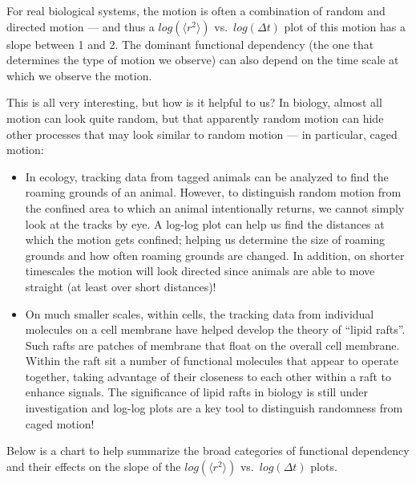  \par
For real biological systems, the motion is often a combination of random and directed motion — and thus a $log(\langle r^{2} \rangle)$ vs.\ $log(\Delta t)$ plot of this motion has a slope between 1 and 2. 
The dominant functional dependency (the one that determines the type of motion we observe) can also depend on the time scale at which we observe the motion.
\par
This is all very interesting, but how is it helpful to us?
In biology, almost all motion can look quite random, but that apparently random motion can hide other processes that may look similar to random motion — in particular, caged motion:
\begin{itemize}
\item In ecology, tracking data from tagged animals can be analyzed to find the roaming grounds of an animal.
However, to distinguish random motion from the confined area to which an animal intentionally returns, we cannot simply look at the tracks by eye.
A log-log plot can help us find the distances at which the motion gets confined; helping us determine the size of roaming grounds and how often roaming grounds are changed.
In addition, on shorter timescales the motion will look directed since animals are able to move straight (at least over short distances)!
\item On much smaller scales, within cells, the tracking data from individual molecules on a cell membrane have helped develop the theory of ``lipid rafts''. Such rafts are patches of membrane that float on the overall cell membrane. Within the raft sit a number of functional molecules that appear to operate together, taking advantage of their closeness to each other within a raft to enhance signals. The significance of lipid rafts in biology is still under investigation and log-log plots are a key tool to distinguish randomness from caged motion!
\end{itemize}
%
Below is a chart to help summarize the broad categories of functional dependency and their effects on the slope of the $log(\langle r^{2} \rangle)$ vs.\ $log(\Delta t)$ plots.


